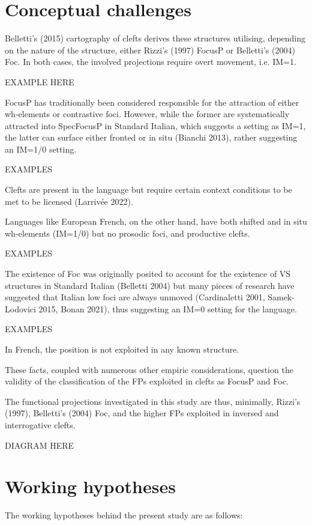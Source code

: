 \documentclass[fleqn,10pt]{wlscirep}
\begin{document}
\section*{Conceptual challenges}

Belletti’s (2015) cartography of clefts derives these structures utilising, depending on the nature of the structure, either Rizzi’s (1997) FocusP or Belletti’s (2004) Foc. 
In both cases, the involved projections require overt movement, i.e. IM=1.

EXAMPLE HERE

FocusP has traditionally been considered responsible for the attraction of either wh-elements or contrastive foci. 
However, while the former are systematically attracted into SpecFocusP in Standard Italian, which suggests a setting as IM=1, the latter can surface either fronted or in situ (Bianchi 2013), rather suggesting an IM=1/0 setting. 

EXAMPLES

Clefts are present in the language but require certain context conditions to be met to be licensed (Larrivée 2022). 

Languages like European French, on the other hand, have both shifted and in situ wh-elements (IM=1/0) but no prosodic foci, and productive clefts. 

EXAMPLES

The existence of Foc was originally posited to account for the existence of VS structures in Standard Italian (Belletti 2004) but many pieces of research have suggested that Italian low foci are always unmoved (Cardinaletti 2001, Samek-Lodovici 2015, Bonan 2021), thus suggesting an IM=0 setting for the language. 

EXAMPLES

In French, the position is not exploited in any known structure. 

These facts, coupled with numerous other empiric considerations, question the validity of the classification of the FPs exploited in clefts as FocusP and Foc. 

The functional projections investigated in this study are thus, minimally, Rizzi’s (1997), Belletti’s (2004) Foc, and the higher FPs exploited in inversed and interrogative clefts.

DIAGRAM HERE

\section*{Working hypotheses}
The working hypotheses behind the present study are as follows:
\end{document}
